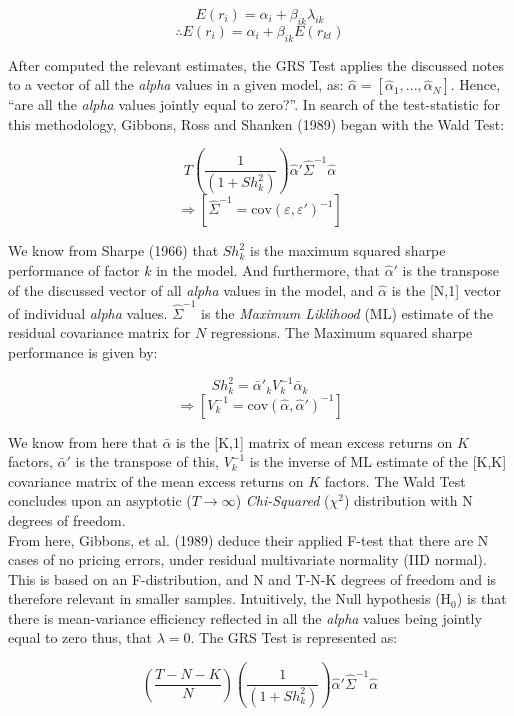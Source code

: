 \documentclass[11pt, english]{article}
\begin{document}
	$$E(r_i)=\alpha_i+\beta_{ik}\lambda_{ik}$$
        $$\therefore E(r_i)=\alpha_i+\beta_{ik}E(r_{kt})$$

	After computed the relevant estimates, the GRS Test applies the discussed notes to a vector of all the \textit{alpha} values in a given model, as: $\hat{\alpha}=[\hat{\alpha}_1,...,\hat{\alpha}_N]$. Hence, ``are all the \textit{alpha} values jointly equal to zero?''. In search of the test-statistic for this methodology, Gibbons, Ross and Shanken (1989) began with the Wald Test:

	$$T\left(\frac{1}{(1+Sh_k^2)}\right)\hat{\alpha}'\hat{\Sigma}^{-1}\hat{\alpha}$$
	$$\Rightarrow[\hat{\Sigma}^{-1}=\mathrm{cov}(\varepsilon,\varepsilon')^{-1}]$$

	We know from Sharpe (1966) that $Sh_k^2$ is the maximum squared sharpe performance of factor $k$ in the model. And furthermore, that $\hat{\alpha}'$ is the transpose of the discussed vector of all \textit{alpha} values in the model, and $\hat{\alpha}$ is the [N,1] vector of individual \textit{alpha} values. $\hat{\Sigma}^{-1}$ is the \textit{Maximum Liklihood} (ML) estimate of the residual covariance matrix for $N$ regressions. The Maximum squared sharpe performance is given by:

	$$Sh_k^2={\bar{\alpha}'}_kV_k^{-1}{\bar{\alpha}}_k$$
	$$\Rightarrow[V_k^{-1}=\mathrm{cov}(\hat{\alpha},\hat{\alpha}')^{-1}]$$

	We know from here that $\bar{\alpha}$ is the [K,1] matrix of mean excess returns on $K$ factors, ${\bar{\alpha}}'$ is the transpose of this, $V_k^{-1}$ is the inverse of ML estimate of the [K,K] covariance matrix of the mean excess returns on $K$ factors. The Wald Test concludes upon an asyptotic ($T\longrightarrow\infty$) \textit{Chi-Squared} ($\chi^2$) distribution with N degrees of freedom.\\

	From here, Gibbons, et al. (1989) deduce their applied F-test that there are N cases of no pricing errors, under residual multivariate normality (IID normal). This is based on an F-distribution, and N and T-N-K degrees of freedom and is therefore relevant in smaller samples. Intuitively, the Null hypothesis (H$_0$) is that there is mean-variance efficiency reflected in all the \textit{alpha} values being jointly equal to zero thus, that $\lambda=0$. The GRS Test is represented as:

	$$\left(\frac{T-N-K}{N}\right)\left(\frac{1}{(1+Sh_k^2)}\right)\hat{\alpha}'\hat{\Sigma}^{-1}\hat{\alpha}$$
\end{document}
